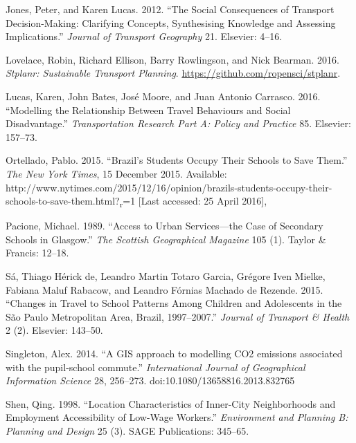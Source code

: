 \documentclass[]{article}
\begin{document}
Jones, Peter, and Karen Lucas. 2012. ``The Social Consequences of
Transport Decision-Making: Clarifying Concepts, Synthesising Knowledge
and Assessing Implications.'' \emph{Journal of Transport Geography} 21.
Elsevier: 4--16.

Lovelace, Robin, Richard Ellison, Barry Rowlingson, and Nick Bearman.
2016. \emph{Stplanr: Sustainable Transport Planning}.
\url{https://github.com/ropensci/stplanr}.

Lucas, Karen, John Bates, Jos{é} Moore, and Juan Antonio Carrasco. 2016.
``Modelling the Relationship Between Travel Behaviours and Social
Disadvantage.'' \emph{Transportation Research Part A: Policy and
Practice} 85. Elsevier: 157--73.

Ortellado, Pablo. 2015. ``Brazil's Students Occupy Their Schools to Save
Them.'' \emph{The New York Times}, 15 December 2015. Available:
http://www.nytimes.com/2015/12/16/opinion/brazils-students-occupy-their-schools-to-save-them.html?\textsubscript{r}=1
{[}Last accessed: 25 April 2016{]},

Pacione, Michael. 1989. ``Access to Urban Services---the Case of
Secondary Schools in Glasgow.'' \emph{The Scottish Geographical
Magazine} 105 (1). Taylor \& Francis: 12--18.

S{á}, Thiago H{é}rick de, Leandro Martin Totaro Garcia, Gr{é}gore Iven
Mielke, Fabiana Maluf Rabacow, and Leandro F{ó}rnias Machado de Rezende.
2015. ``Changes in Travel to School Patterns Among Children and
Adolescents in the São Paulo Metropolitan Area, Brazil, 1997--2007.''
\emph{Journal of Transport \& Health} 2 (2). Elsevier: 143--50.

Singleton, Alex. 2014. ``A GIS approach to modelling CO2 emissions associated with the pupil-school commute.'' \emph{International Journal of Geographical Information Science} 28, 256–273. doi:10.1080/13658816.2013.832765


Shen, Qing. 1998. ``Location Characteristics of Inner-City Neighborhoods
and Employment Accessibility of Low-Wage Workers.'' \emph{Environment
and Planning B: Planning and Design} 25 (3). SAGE Publications: 345--65.
\end{document}
